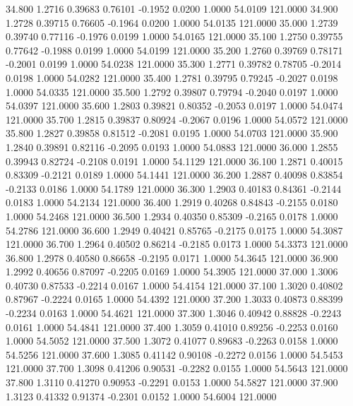   34.800   1.2716   0.39683   0.76101  -0.1952   0.0200   1.0000  54.0109 121.0000
  34.900   1.2728   0.39715   0.76605  -0.1964   0.0200   1.0000  54.0135 121.0000
  35.000   1.2739   0.39740   0.77116  -0.1976   0.0199   1.0000  54.0165 121.0000
  35.100   1.2750   0.39755   0.77642  -0.1988   0.0199   1.0000  54.0199 121.0000
  35.200   1.2760   0.39769   0.78171  -0.2001   0.0199   1.0000  54.0238 121.0000
  35.300   1.2771   0.39782   0.78705  -0.2014   0.0198   1.0000  54.0282 121.0000
  35.400   1.2781   0.39795   0.79245  -0.2027   0.0198   1.0000  54.0335 121.0000
  35.500   1.2792   0.39807   0.79794  -0.2040   0.0197   1.0000  54.0397 121.0000
  35.600   1.2803   0.39821   0.80352  -0.2053   0.0197   1.0000  54.0474 121.0000
  35.700   1.2815   0.39837   0.80924  -0.2067   0.0196   1.0000  54.0572 121.0000
  35.800   1.2827   0.39858   0.81512  -0.2081   0.0195   1.0000  54.0703 121.0000
  35.900   1.2840   0.39891   0.82116  -0.2095   0.0193   1.0000  54.0883 121.0000
  36.000   1.2855   0.39943   0.82724  -0.2108   0.0191   1.0000  54.1129 121.0000
  36.100   1.2871   0.40015   0.83309  -0.2121   0.0189   1.0000  54.1441 121.0000
  36.200   1.2887   0.40098   0.83854  -0.2133   0.0186   1.0000  54.1789 121.0000
  36.300   1.2903   0.40183   0.84361  -0.2144   0.0183   1.0000  54.2134 121.0000
  36.400   1.2919   0.40268   0.84843  -0.2155   0.0180   1.0000  54.2468 121.0000
  36.500   1.2934   0.40350   0.85309  -0.2165   0.0178   1.0000  54.2786 121.0000
  36.600   1.2949   0.40421   0.85765  -0.2175   0.0175   1.0000  54.3087 121.0000
  36.700   1.2964   0.40502   0.86214  -0.2185   0.0173   1.0000  54.3373 121.0000
  36.800   1.2978   0.40580   0.86658  -0.2195   0.0171   1.0000  54.3645 121.0000
  36.900   1.2992   0.40656   0.87097  -0.2205   0.0169   1.0000  54.3905 121.0000
  37.000   1.3006   0.40730   0.87533  -0.2214   0.0167   1.0000  54.4154 121.0000
  37.100   1.3020   0.40802   0.87967  -0.2224   0.0165   1.0000  54.4392 121.0000
  37.200   1.3033   0.40873   0.88399  -0.2234   0.0163   1.0000  54.4621 121.0000
  37.300   1.3046   0.40942   0.88828  -0.2243   0.0161   1.0000  54.4841 121.0000
  37.400   1.3059   0.41010   0.89256  -0.2253   0.0160   1.0000  54.5052 121.0000
  37.500   1.3072   0.41077   0.89683  -0.2263   0.0158   1.0000  54.5256 121.0000
  37.600   1.3085   0.41142   0.90108  -0.2272   0.0156   1.0000  54.5453 121.0000
  37.700   1.3098   0.41206   0.90531  -0.2282   0.0155   1.0000  54.5643 121.0000
  37.800   1.3110   0.41270   0.90953  -0.2291   0.0153   1.0000  54.5827 121.0000
  37.900   1.3123   0.41332   0.91374  -0.2301   0.0152   1.0000  54.6004 121.0000
